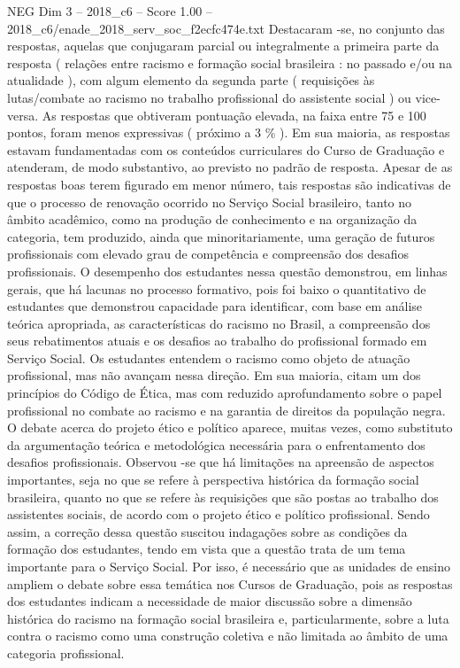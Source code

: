 \begin{textsample}{NEG Dim 3 – 2018\_c6 – Score 1.00 – 2018\_c6/enade\_2018\_serv\_soc\_f2ecfc474e.txt}
Destacaram -se, no conjunto das respostas, aquelas que conjugaram parcial ou integralmente a primeira parte da resposta ( relações entre racismo e formação social brasileira : no passado e/ou na atualidade ), com algum elemento da segunda parte ( requisições às lutas/combate ao racismo no trabalho profissional do assistente social ) ou vice-versa.
As respostas que obtiveram pontuação elevada, na faixa entre 75 e 100 pontos, foram menos expressivas ( próximo a 3 \% ).
Em sua maioria, as respostas estavam fundamentadas com os conteúdos curriculares do Curso de Graduação e atenderam, de modo substantivo, ao previsto no padrão de resposta.
Apesar de as respostas boas terem figurado em menor número, tais respostas são indicativas de que o processo de renovação ocorrido no Serviço Social brasileiro, tanto no âmbito acadêmico, como na produção de conhecimento e na organização da categoria, tem produzido, ainda que minoritariamente, uma geração de futuros profissionais com elevado grau de competência e compreensão dos desafios profissionais.
O desempenho dos estudantes nessa questão demonstrou, em linhas gerais, que há lacunas no processo formativo, pois foi baixo o quantitativo de estudantes que demonstrou capacidade para identificar, com base em análise teórica apropriada, as características do racismo no Brasil, a compreensão dos seus rebatimentos atuais e os desafios ao trabalho do profissional formado em Serviço Social.
Os estudantes entendem o racismo como objeto de atuação profissional, mas não avançam nessa direção.
Em sua maioria, citam um dos princípios do Código de Ética, mas com reduzido aprofundamento sobre o papel profissional no combate ao racismo e na garantia de direitos da população negra.
O debate acerca do projeto ético e político aparece, muitas vezes, como substituto da argumentação teórica e metodológica necessária para o enfrentamento dos desafios profissionais.
Observou -se que há limitações na apreensão de aspectos importantes, seja no que se refere à perspectiva histórica da formação social brasileira, quanto no que se refere às requisições que são postas ao trabalho dos assistentes sociais, de acordo com o projeto ético e político profissional.
Sendo assim, a correção dessa questão suscitou indagações sobre as condições da formação dos estudantes, tendo em vista que a questão trata de um tema importante para o Serviço Social.
Por isso, é necessário que as unidades de ensino ampliem o debate sobre essa temática nos Cursos de Graduação, pois as respostas dos estudantes indicam a necessidade de maior discussão sobre a dimensão histórica do racismo na formação social brasileira e, particularmente, sobre a luta contra o racismo como uma construção coletiva e não limitada ao âmbito de uma categoria profissional.

\end{textsample}
